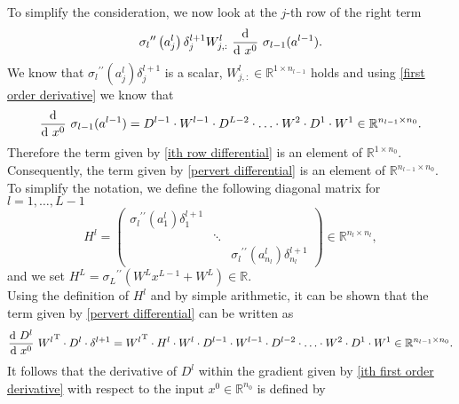 To simplify the consideration, we now look at the $j$-th row of the right term
\begin{equation}
    \label{ith row differential}
    {\sigma_{l}}^{\prime \prime} \left( a^{l}_{j} \right) \delta^{l+1}_{j}  W^{l}_{j,:} \ \frac{\textup{d}}{\textup{d} \ x^0} \  \sigma_{l-1}(a^{l-1}).
\end{equation}
We know that ${\sigma_{l}}^{\prime \prime} \left( a^{l}_{j} \right) \delta^{l+1}_{j}$ is a scalar, $W^{l}_{j,:} \in \mathbb{R}^{1 \times n_{l-1}}$ holds and using \cref{first order derivative} we know that
\begin{equation}
    \label{ith row differential 2}
    \frac{\textup{d}}{\textup{d} \ x^0} \  \sigma_{l-1}(a^{l-1}) = D^{l-1} \cdot W^{l-1} \cdot D^{L-2} \cdot \ldots \cdot W^2 \cdot D^1 \cdot W^{1} \in \mathbb{R}^{n_{l-1} \times n_0}.
\end{equation}
Therefore the term given by \cref{ith row differential} is an element of $\mathbb{R}^{1 \times n_0}$. Consequently, the term given by \cref{pervert differential} is an element of $\mathbb{R}^{n_{l-1} \times n_0}$. \\
To simplify the notation, we define the following diagonal matrix for $l = 1, \ldots, L-1$
\begin{equation}
    \label{second:derivative:activation:function}
    H^{l} = \begin{pmatrix} {\sigma_{l}}^{\prime \prime} \left( a^{l}_1 \right) \delta^{l+1}_1 & & \\ & \ddots & \\ & & {\sigma_{l}}^{\prime \prime} \left( a^{l}_{n_l} \right) \delta^{l+1}_{n_l} \end{pmatrix} \in \mathbb{R}^{n_l \times n_l}, 
\end{equation}
and we set $H^{L} = {\sigma_L}^{\prime \prime} \left(W^L x^{L-1}  + W^L \right) \in \mathbb{R}$. \\
Using the definition of $H^{l}$ and by simple arithmetic, it can be shown that the term given by \cref{pervert differential} can be written as
\begin{equation*}
    \frac{\textup{d} \ D^{l}}{\textup{d} \ x^0} \  {W^{l}}^{\mathrm{T}} \cdot D^{l} \cdot \delta^{l+1} = {W^{l}}^{\mathrm{T}} \cdot H^{l} \cdot W^l \cdot D^{l-1} \cdot W^{l-1} \cdot D^{l-2} \cdot \ldots \cdot W^2 \cdot D^1 \cdot W^{1} \in \mathbb{R}^{n_{l-1} \times n_0}.
\end{equation*}
It follows that the derivative of $D^l$ within the gradient given by \cref{ith first order derivative} with respect to the input $x^0 \in \mathbb{R}^{n_0}$ is defined by  
